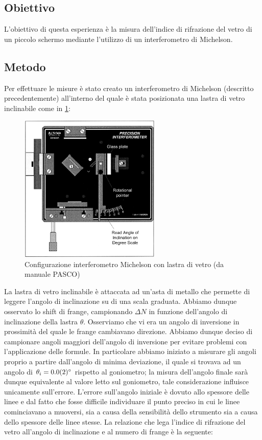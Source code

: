 \documentclass[a4paper]{article}
\begin{document}
\subsection{Obiettivo}
L'obiettivo di questa esperienza è la misura dell'indice di rifrazione del vetro di un piccolo schermo mediante l'utilizzo di un interferometro di Michelson.
\subsection{Metodo}
Per effettuare le misure è stato creato un interferometro di Michelson (descritto precedentemente) all'interno del quale è stata posizionata una lastra di vetro inclinabile come in \cref{fig:michelson-vetro}:
\begin{figure}[htbp]
\centering
\includegraphics[width=0.6\textwidth]{./grafici/Michaelson vetro.png}
\caption{Configurazione interferometro Michelson con lastra di vetro (da manuale PASCO)}
\label{fig:michelson-vetro}
\end{figure}
La lastra di vetro inclinabile è attaccata ad un'asta di metallo che permette di leggere l'angolo di inclinazione su di una scala graduata. Abbiamo dunque osservato lo shift di frange, campionando $\Delta N$ in funzione dell'angolo di inclinazione della lastra $\theta$. Osserviamo che vi era un angolo di inversione in prossimità del quale le frange cambiavano direzione. Abbiamo dunque deciso di campionare angoli maggiori dell'angolo di inversione per evitare problemi con l'applicazione delle formule. In particolare abbiamo iniziato a misurare gli angoli proprio a partire dall'angolo di minima deviazione, il quale si trovava ad un angolo di $\theta_i = \SI{0 \pm 0.2}{\degree}$ rispetto al goniometro; la misura dell'angolo finale sarà dunque equivalente al valore letto sul goniometro, tale considerazione influisce unicamente sull'errore. L'errore sull'angolo iniziale è dovuto allo spessore delle linee e dal fatto che fosse difficile individuare il punto preciso in cui le linee cominciavano a muoversi, sia a causa della sensibilità dello strumento sia a causa dello spessore delle linee stesse. La relazione che lega l'indice di rifrazione del vetro all'angolo di inclinazione e al numero di frange è la seguente:
\end{document}
